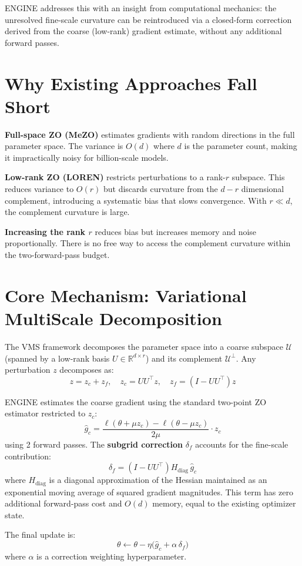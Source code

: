 \documentclass[10pt,twocolumn]{article}
\begin{document}
ENGINE addresses this with an insight from computational mechanics:
the unresolved fine-scale curvature can be reintroduced via a closed-form
correction derived from the coarse (low-rank) gradient estimate, without
any additional forward passes.

\section{Why Existing Approaches Fall Short}

\textbf{Full-space ZO (MeZO)} estimates gradients with random directions
in the full parameter space. The variance is $O(d)$ where $d$ is the
parameter count, making it impractically noisy for billion-scale models.

\textbf{Low-rank ZO (LOREN)} restricts perturbations to a rank-$r$
subspace. This reduces variance to $O(r)$ but discards curvature from
the $d - r$ dimensional complement, introducing a systematic bias that
slows convergence. With $r \ll d$, the complement curvature is large.

\textbf{Increasing the rank $r$} reduces bias but increases memory and
noise proportionally. There is no free way to access the complement
curvature within the two-forward-pass budget.

\section{Core Mechanism: Variational MultiScale Decomposition}

The VMS framework decomposes the parameter space into a coarse
subspace $\mathcal{U}$ (spanned by a low-rank basis
$U \in \mathbb{R}^{d \times r}$) and its complement
$\mathcal{U}^\perp$. Any perturbation $z$ decomposes as:
\[
  z = z_c + z_f, \quad z_c = UU^\top z,\quad z_f = (I - UU^\top) z
\]

ENGINE estimates the coarse gradient using the standard two-point
ZO estimator restricted to $z_c$:
\[
  \hat{g}_c = \frac{\ell(\theta + \mu z_c) - \ell(\theta - \mu z_c)}{2\mu} \cdot z_c
\]
using 2 forward passes. The \textbf{subgrid correction}
$\delta_f$ accounts for the fine-scale contribution:
\[
  \delta_f = (I - UU^\top) H_\text{diag}\, \hat{g}_c
\]
where $H_\text{diag}$ is a diagonal approximation of the Hessian
maintained as an exponential moving average of squared gradient
magnitudes. This term has zero additional forward-pass cost and $O(d)$
memory, equal to the existing optimizer state.

The final update is:
\[
  \theta \leftarrow \theta - \eta\bigl(\hat{g}_c + \alpha\, \delta_f\bigr)
\]
where $\alpha$ is a correction weighting hyperparameter.
\end{document}
